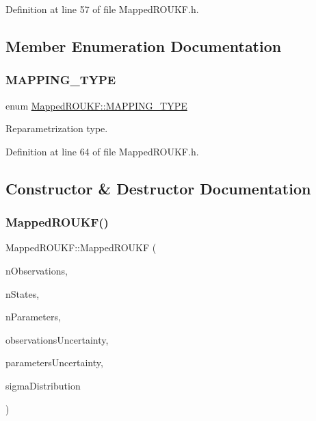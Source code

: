Definition at line 57 of file Mapped\+R\+O\+U\+K\+F.\+h.



\subsection{Member Enumeration Documentation}
\mbox{\label{classMappedROUKF_a9aa29956ea12176771fbec185601deca}} 
\subsubsection{\texorpdfstring{M\+A\+P\+P\+I\+N\+G\+\_\+\+T\+Y\+PE}{MAPPING\_TYPE}}
{\footnotesize\ttfamily enum \mbox{\hyperlink{classMappedROUKF_a9aa29956ea12176771fbec185601deca}{Mapped\+R\+O\+U\+K\+F\+::\+M\+A\+P\+P\+I\+N\+G\+\_\+\+T\+Y\+PE}}}

Reparametrization type. 

Definition at line 64 of file Mapped\+R\+O\+U\+K\+F.\+h.



\subsection{Constructor \& Destructor Documentation}
\mbox{\label{classMappedROUKF_a3747b98efef856486df6428746807808}} 
\subsubsection{\texorpdfstring{Mapped\+R\+O\+U\+K\+F()}{MappedROUKF()}\hspace{0.1cm}{\footnotesize\ttfamily [1/3]}}
{\footnotesize\ttfamily Mapped\+R\+O\+U\+K\+F\+::\+Mapped\+R\+O\+U\+KF (\begin{DoxyParamCaption}\item[{int}]{n\+Observations,  }\item[{int}]{n\+States,  }\item[{int}]{n\+Parameters,  }\item[{vector$<$ double $>$}]{observations\+Uncertainty,  }\item[{vector$<$ double $>$}]{parameters\+Uncertainty,  }\item[{\mbox{\hyperlink{classSigmaPointsGenerator_ad6f9474c0313425a10add120e0acf944}{Sigma\+Points\+Generator\+::\+S\+I\+G\+M\+A\+\_\+\+D\+I\+S\+T\+R\+I\+B\+U\+T\+I\+ON}}}]{sigma\+Distribution }\end{DoxyParamCaption})}

